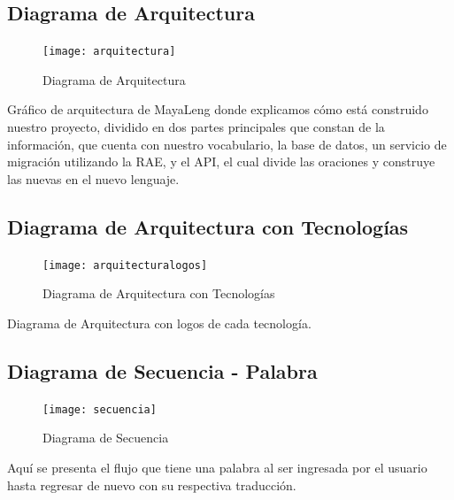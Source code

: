 \documentclass[a4paper,openright,11pt]{article}
\begin{document}
\subsection{Diagrama de Arquitectura}
\begin{figure}[h]
	\centering
	\texttt{[image: arquitectura]}
	\caption{Diagrama de Arquitectura}
	\label{fig:arq}
\end{figure}

\newpage
Gráfico de arquitectura de MayaLeng donde explicamos cómo está construido nuestro proyecto, dividido en dos partes principales que constan de la información, que cuenta con nuestro vocabulario, la base de datos, un servicio de migración utilizando la RAE, y el API, el cual divide las oraciones y construye las nuevas en el nuevo lenguaje.

\subsection{Diagrama de Arquitectura con Tecnologías}
\begin{figure}[H]
	\centering
	\texttt{[image: arquitecturalogos]}
	\caption{Diagrama de Arquitectura con Tecnologías} 
	\label{fig:arqL}
\end{figure}
Diagrama de Arquitectura con logos de cada tecnología.

\subsection{Diagrama de Secuencia - Palabra}
\begin{figure}[h]
	\centering
	\texttt{[image: secuencia]}
	\caption{Diagrama de Secuencia}
	\label{fig:sec}
\end{figure}
Aquí se presenta el flujo que tiene una palabra al ser ingresada por el usuario hasta regresar de nuevo con su respectiva traducción.
\end{document}
